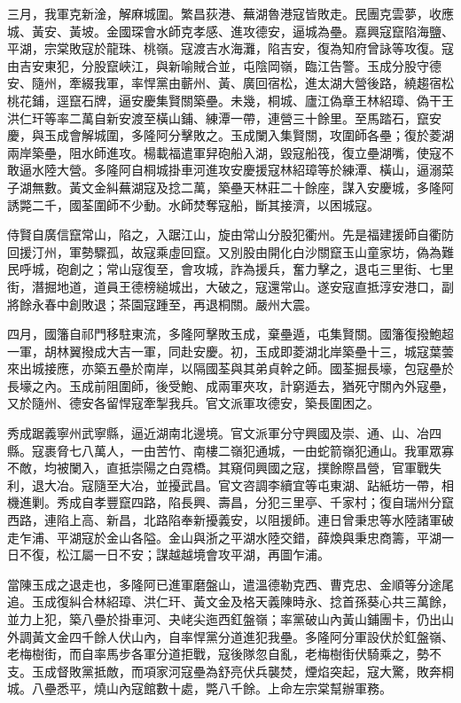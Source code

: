 \begin{pinyinscope}
三月，我軍克新淦，解麻城圍。繁昌荻港、蕪湖魯港寇皆敗走。民團克雲夢，收應城、黃安、黃坡。金國琛會水師克孝感、進攻德安，逼城為壘。嘉興寇竄陷海鹽、平湖，宗棠敗寇於龍珠、桃嶺。寇渡吉水海灘，陷吉安，復為知府曾詠等攻復。寇由吉安東犯，分股竄峽江，與新喻賊合並，屯陰岡嶺，臨江告警。玉成分股守德安、隨州，牽綴我軍，率悍黨由蘄州、黃、廣回宿松，進太湖大營後路，繞趨宿松桃花鋪，逕竄石牌，逼安慶集賢關築壘。未幾，桐城、廬江偽章王林紹璋、偽干王洪仁玕等率二萬自新安渡至橫山鋪、練潭一帶，連營三十餘里。至馬踏石，竄安慶，與玉成會解城圍，多隆阿分擊敗之。玉成闌入集賢關，攻圍師各壘；復於菱湖兩岸築壘，阻水師進攻。楊載福遣軍舁砲船入湖，毀寇船筏，復立壘湖嘴，使寇不敢逼水陸大營。多隆阿自桐城掛車河進攻安慶援寇林紹璋等於練潭、橫山，逼溺菜子湖無數。黃文金糾蕪湖寇及捻二萬，築壘天林莊二十餘座，謀入安慶城，多隆阿誘斃二千，國荃圍師不少動。水師焚奪寇船，斷其接濟，以困城寇。

侍賢自廣信竄常山，陷之，入踞江山，旋由常山分股犯衢州。先是福建援師自衢防回援汀州，軍勢驟孤，故寇乘虛回竄。又別股由開化白沙關竄玉山童家坊，偽為難民呼城，砲創之；常山寇復至，會攻城，詐為援兵，奮力擊之，退屯三里街、七里街，潛掘地道，道員王德榜縋城出，大破之，寇還常山。遂安寇直抵淳安港口，副將餘永春中創敗退；茶園寇踵至，再退桐關。嚴州大震。

四月，國籓自祁門移駐東流，多隆阿擊敗玉成，棄壘遁，屯集賢關。國籓復撥鮑超一軍，胡林翼撥成大吉一軍，同赴安慶。初，玉成即菱湖北岸築壘十三，城寇葉蕓來出城接應，亦築五壘於南岸，以隔國荃與其弟貞幹之師。國荃掘長壕，包寇壘於長壕之內。玉成前阻圍師，後受鮑、成兩軍夾攻，計窮遁去，猶死守關內外寇壘，又於隨州、德安各留悍寇牽掣我兵。官文派軍攻德安，築長圍困之。

秀成踞義寧州武寧縣，逼近湖南北邊境。官文派軍分守興國及崇、通、山、冶四縣。寇裹脅七八萬人，一由苦竹、南樓二嶺犯通城，一由蛇箭嶺犯通山。我軍眾寡不敵，均被闌入，直抵崇陽之白霓橋。其窺伺興國之寇，撲餘際昌營，官軍戰失利，退大冶。寇隨至大冶，並擾武昌。官文咨調李續宜等屯東湖、跕紙坊一帶，相機進剿。秀成自孝豐竄四路，陷長興、壽昌，分犯三里亭、千家村；復自瑞州分竄西路，連陷上高、新昌，北路陷奉新擾義安，以阻援師。連日曾秉忠等水陸諸軍破走乍浦、平湖寇於金山各隘。金山與浙之平湖水陸交錯，薛煥與秉忠商籌，平湖一日不復，松江屬一日不安；謀越越境會攻平湖，再圖乍浦。

當陳玉成之退走也，多隆阿已進軍磨盤山，遣溫德勒克西、曹克忠、金順等分途尾追。玉成復糾合林紹璋、洪仁玕、黃文金及格天義陳時永、捻首孫葵心共三萬餘，並力上犯，築八壘於掛車河、夬峔尖迤西釭盤嶺；率黨破山內黃山鋪團卡，仍出山外調黃文金四千餘人伏山內，自率悍黨分道進犯我壘。多隆阿分軍設伏於釭盤嶺、老梅樹街，而自率馬步各軍分道拒戰，寇後隊忽自亂，老梅樹街伏騎乘之，勢不支。玉成督敗黨抵敵，而項家河寇壘為舒亮伏兵襲焚，煙焰突起，寇大驚，敗奔桐城。八壘悉平，燒山內寇館數十處，斃八千餘。上命左宗棠幫辦軍務。


\end{pinyinscope}
